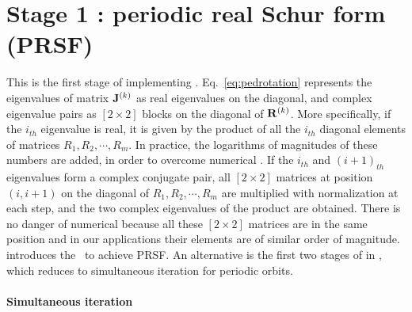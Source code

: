 \documentclass[final,leqno,onefignum,onetabnum]{siamltexmm}
\begin{document}
\section{Stage 1 :  periodic real Schur form (PRSF)}
\label{sect:psd}
This is the first stage of implementing \ped.
Eq.~\eqref{eq:pedrotation} represents the eigenvalues of matrix
$\mathbf{J}^{(k)}$ as real eigenvalues on the diagonal, and complex
eigenvalue pairs as $[2\!\times\! 2]$ blocks on the diagonal of
$\mathbf{R}^{(k)}$. More specifically, if the $i_{th}$
eigenvalue is real, it is given by the product of all the $i_{th}$
diagonal elements of matrices $R_{1},R_{2},\cdots,R_{m}$. In practice,
the logarithms of magnitudes of these numbers are added, in order to
overcome numerical . If the $i_{th}$ and $(i+1)_{th}$
eigenvalues form a complex conjugate pair, all $[2\!\times\! 2]$ matrices
at position $(i,i+1)$ on the diagonal of $R_{1},R_{2},\cdots,R_{m}$ are
multiplied with normalization at each step, and the two complex
eigenvalues of the product are obtained. There is no danger of numerical
because all these $[2\!\times\! 2]$  matrices are in the same
position and  in our applications their elements are of similar order of
magnitude.
 introduces the \psd\ to achieve PRSF. An
alternative is the first two stages of  in ,
which reduces to simultaneous iteration for periodic orbits.

\paragraph{Simultaneous iteration}
\end{document}
